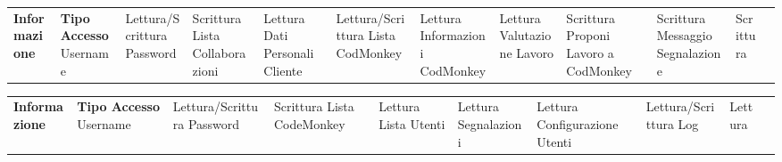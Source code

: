 \begin{center}
\begin{tabularx}
        \n
    \end{tabularx}\label{tab:monkeytable:problema:tabellaRuoloInformazioni:Codmonkey}


    \phantom{M}%


    \begin{tabularx}
        {\textwidth} {|X|X|}
        \hline  {}
        \n      {}
        \large \textbf{Informazione}       & \centering\large\textbf{Tipo Accesso}
        \n      Username                   & Lettura/Scrittura
        \n      Password                   & Scrittura
        \n      Lista Collaborazioni       & Lettura
        \n      Dati Personali Cliente     & Lettura/Scrittura
        \n      Lista CodMonkey            & Lettura
        \n      Informazioni CodMonkey     & Lettura
        \n      Valutazione Lavoro         & Scrittura
        \n      Proponi Lavoro a CodMonkey & Scrittura
        \n      Messaggio Segnalazione     & Scrittura
        \n
    \end{tabularx}\label{tab:monkeytable:problema:tabellaRuoloInformazioni:Cliente}


    \phantom{M}%


    \begin{tabularx}
        {\textwidth} {|X|X|}
        \hline  {}
        \n      {}
        \large \textbf{Informazione}  & \centering\large\textbf{Tipo Accesso}
        \n      Username              & Lettura/Scrittura
        \n      Password              & Scrittura
        \n      Lista CodeMonkey      & Lettura
        \n      Lista Utenti          & Lettura
        \n      Segnalazioni          & Lettura
        \n      Configurazione Utenti & Lettura/Scrittura
        \n      Log                   & Lettura
        \n
    \end{tabularx}\label{tab:monkeytable:problema:tabellaRuoloInformazioni:Amministratore}




\end{center}
